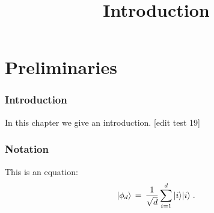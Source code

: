 

%



\part{Preliminaries}
\label{book-part-preliminaries}

\title{Introduction}
\label{introduction}


\maketitle


\tableofcontents


\section{Introduction}
\label{section:introduction}

In this chapter we give an introduction. [edit test 19]

\section{Notation}
\label{section-notation}

This is an equation:
\begin{equation}
\label{eq:me-state}
 |\phi_d\rangle \,=\,\frac{1}{\sqrt{d}} \sum_{i=1}^d |i\rangle|i\rangle\;.
\end{equation}








